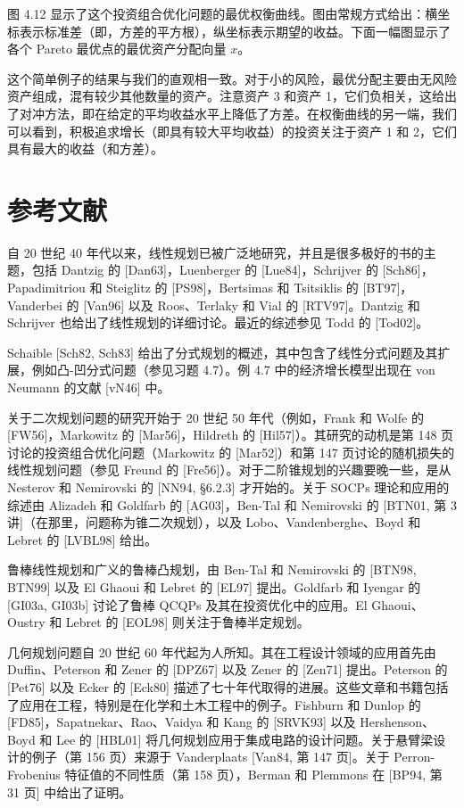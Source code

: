 \documentclass[UTF8,12pt,a4paper,fontset=fandol]{ctexart}
\begin{document}
图 4.12 显示了这个投资组合优化问题的最优权衡曲线。图由常规方式给出：横坐标表示标准差（即，方差的平方根），纵坐标表示期望的收益。下面一幅图显示了各个 Pareto 最优点的最优资产分配向量 $x$。

这个简单例子的结果与我们的直观相一致。对于小的风险，最优分配主要由无风险资产组成，混有较少其他数量的资产。注意资产 3 和资产 1，它们负相关，这给出了对冲方法，即在给定的平均收益水平上降低了方差。在权衡曲线的另一端，我们可以看到，积极追求增长（即具有较大平均收益）的投资关注于资产 1 和 2，它们具有最大的收益（和方差）。

\section*{参考文献}

自 20 世纪 40 年代以来，线性规划已被广泛地研究，并且是很多极好的书的主题，包括 Dantzig 的 [Dan63]，Luenberger 的 [Lue84]，Schrijver 的 [Sch86]，Papadimitriou 和 Steiglitz 的 [PS98]，Bertsimas 和 Tsitsiklis 的 [BT97]，Vanderbei 的 [Van96] 以及 Roos、Terlaky 和 Vial 的 [RTV97]。Dantzig 和 Schrijver 也给出了线性规划的详细讨论。最近的综述参见 Todd 的 [Tod02]。

Schaible [Sch82, Sch83] 给出了分式规划的概述，其中包含了线性分式问题及其扩展，例如凸-凹分式问题（参见习题 4.7）。例 4.7 中的经济增长模型出现在 von Neumann 的文献 [vN46] 中。

关于二次规划问题的研究开始于 20 世纪 50 年代（例如，Frank 和 Wolfe 的 [FW56]，Markowitz 的 [Mar56]，Hildreth 的 [Hil57]）。其研究的动机是第 148 页讨论的投资组合优化问题（Markowitz 的 [Mar52]）和第 147 页讨论的随机损失的线性规划问题（参见 Freund 的 [Fre56]）。对于二阶锥规划的兴趣要晚一些，是从 Nesterov 和 Nemirovski 的 [NN94, \S 6.2.3] 才开始的。关于 SOCPs 理论和应用的综述由 Alizadeh 和 Goldfarb 的 [AG03]，Ben-Tal 和 Nemirovski 的 [BTN01, 第 3 讲]（在那里，问题称为锥二次规划），以及 Lobo、Vandenberghe、Boyd 和 Lebret 的 [LVBL98] 给出。

鲁棒线性规划和广义的鲁棒凸规划，由 Ben-Tal 和 Nemirovski 的 [BTN98, BTN99] 以及 El Ghaoui 和 Lebret 的 [EL97] 提出。Goldfarb 和 Iyengar 的 [GI03a, GI03b] 讨论了鲁棒 QCQPs 及其在投资优化中的应用。El Ghaoui、Oustry 和 Lebret 的 [EOL98] 则关注于鲁棒半定规划。

几何规划问题自 20 世纪 60 年代起为人所知。其在工程设计领域的应用首先由 Duffin、Peterson 和 Zener 的 [DPZ67] 以及 Zener 的 [Zen71] 提出。Peterson 的 [Pet76] 以及 Ecker 的 [Eck80] 描述了七十年代取得的进展。这些文章和书籍包括了应用在工程，特别是在化学和土木工程中的例子。Fishburn 和 Dunlop 的 [FD85]，Sapatnekar、Rao、Vaidya 和 Kang 的 [SRVK93] 以及 Hershenson、Boyd 和 Lee 的 [HBL01] 将几何规划应用于集成电路的设计问题。关于悬臂梁设计的例子（第 156 页）来源于 Vanderplaats [Van84, 第 147 页]。关于 Perron-Frobenius 特征值的不同性质（第 158 页），Berman 和 Plemmons 在 [BP94, 第 31 页] 中给出了证明。
\end{document}
